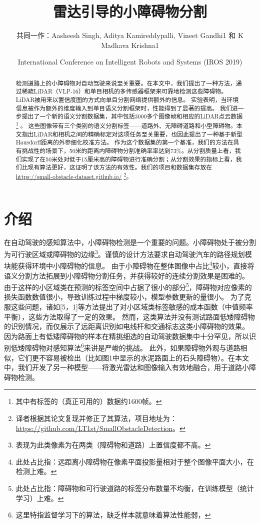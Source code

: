 \documentclass[lang=cn,11pt]{elegantpaper}
\title{雷达引导的小障碍物分割}
\author{共同一作：Aasheesh Singh, Aditya Kamireddypalli, Vineet Gandhi1 和 K Madhava Krishna1  }
\institute{国际信息技术学院, 海德拉巴, 印度}
\date{International Conference on Intelligent Robots and Systems (IROS 2019) }
\begin{document}
\maketitle

\begin{abstract}
\noindent 

检测道路上的小障碍物对自动驾驶来说至关重要。在本文中，我们提出了一种方法，通过稀疏LiDAR（VLP-16）和单目相机的多传感器框架来可靠地检测这些障碍物。LiDAR被用来以置信度图的方式向单目分割网络提供额外的信息。
实验表明，当环境信息被作为额外的维度输入到单目语义分割框架时，性能得到了显著的提高。
我们进一步提出了一个新的语义分割数据集，其中包括3000多个图像帧和相应的LiDAR点云数据\hl{}\footnote{其中有标签的（真正可用的）数据约1600帧。} 。
这些图像带有三个类别的语义分割标签——道路外、无障碍道路和小型障碍物。本文指出LiDAR和相机之间的精确标定对这项任务至关重要，也因此提出了一种基于新型Hausdorff距离的外参细化校准方法。
作为这个数据集的第一个基准，我们的方法在具有挑战性的场景下，50米的距离内障碍物分割准确率率达到73\%。从分割质量上看，我们实现了在50米处对低于15厘米高的障碍物进行准确分割；从分割效果的指标上看，我们比现有算法更好，这证明了该方法的有效性。我们的项目和数据集存放在 \href{https://small-obstacle-dataset.github.io/}{https://small-obstacle-dataset.github.io/}
\footnote{译者根据其论文复现并修正了其算法，项目地址为：\href{https://github.com/LT1st/SmallObstacleDetection}{https://github.com/LT1st/SmallObstacleDetection}。}。

\end{abstract}


\section{介绍}
在自动驾驶的感知算法中，小障碍物检测是一个重要的问题。小障碍物处于被分割为可行驶区域或障碍物的边缘\footnote{表现为此类像素为在两类（障碍物和道路）上置信度都不高。}。谨慎的设计方法要求自动驾驶汽车的路径规划模块能获得环境中小障碍物的信息。
由于小障碍物在整体图像中占比\footnote{此处占比指：远距离小障碍物在像素平面投影量相对于整个图像平面大小，在检测上难。}较小，直接将语义分割方法拓展到小障碍物分割任务，并获得较好的连续分割效果是困难的。
由于这样的小区域类在预测的标签空间中占据了很小的部分\footnote{此处占比指：障碍物和可行驶道路的标签分布数量不均衡，在训练模型（统计学习）上难。}，障碍物对应像素的损失函数数值很小，导致训练过程中梯度较小，模型参数更新的量很小。
为了克服这些问题，诸如[5，1]等方法提出了对小区域类标签敏感的成本函数（中值频率平衡），这些方法取得了一定的效果。
然而，这类算法并没有测试路面低矮障碍物的识别情况，而仅展示了远距离识别如电线杆和交通标志这类小障碍物的效果。
因为路面上有低矮障碍物的样本在精挑细选的自动驾驶数据集中十分罕见，所以识别低矮障碍物对感知算法\footnote{这里特指监督学习下的算法，缺乏样本就意味着算法性能弱，}来讲是严峻的挑战。
此外，如果障碍物外观与道路相似，它们更不容易被检出（比如图1中显示的水泥路面上的石头障碍物）。在本文中，我们开发了另一种模型——将激光雷达和图像输入有效地融合，用于道路小障碍物检测。
\end{document}
